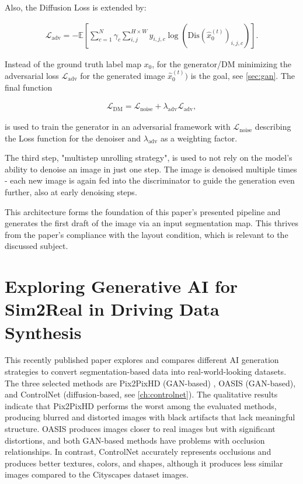 Also, the Diffusion Loss is extended by:

\begin{align} \label{eq:seg-loss}
\mathcal{L}_{\text{adv}} = -\mathbb{E}\left[ \sum_{c=1}^{N}\gamma_c \sum_{i,j}^{H \times W} y_{i,j,c} \log \left(\text{Dis}(\hat{x}_0^{(t)})_{i,j,c}\right)
\right].
\end{align}

Instead of the ground truth label map $x_0$, for the generator/DM minimizing the adversarial loss $\mathcal{L}_\text{adv}$ for the generated image $\hat{x}_0^{(t)})$ is the goal, see \autoref{sec:gan}. The final function

\begin{align} \label{eq:overall-loss}
\mathcal{L}_{\text{DM}} = \mathcal{L}_{\text{noise}} + \lambda_{\text{adv}} \mathcal{L}_{\text{adv}},
\end{align}

is used to train the generator in an adversarial framework with $\mathcal{L}_{\text{noise}}$ describing the Loss function for the denoiser and $\lambda_{\text{adv}}$ as a weighting factor.

The third step, "multistep unrolling strategy"\cite{li2024aldm}, is used to not rely on the model's ability to denoise an image in just one step. The image is denoised multiple times - each new image is again fed into the discriminator to guide the generation even further, also at early denoising steps.

This architecture forms the foundation of this paper's presented pipeline and generates the first draft of the image via an input segmentation map. This thrives from the paper's compliance with the layout condition, which is relevant to the discussed subject. \cite{li2024aldm}

\section{Exploring Generative AI for Sim2Real in Driving Data Synthesis}
\label{ch:exploring_generative_ai_for_sim2real_in_driving_data_synthesis}

This recently published paper \cite{zhao2024exploring} explores and compares different AI generation strategies to convert segmentation-based data into real-world-looking datasets. The three selected methods are Pix2PixHD (GAN-based) \cite{wang2018highresolutionimagesynthesissemantic}, OASIS \cite{sushko2021needadversarialsupervisionsemantic} (GAN-based), and ControlNet (diffusion-based, see \autoref{ch:controlnet}). The qualitative results indicate that Pix2PixHD performs the worst among the evaluated methods, producing blurred and distorted images with black artifacts that lack meaningful structure. OASIS produces images closer to real images but with significant distortions, and both GAN-based methods have problems with occlusion relationships. In contrast, ControlNet accurately represents occlusions and produces better textures, colors, and shapes, although it produces less similar images compared to the Cityscapes dataset images.

